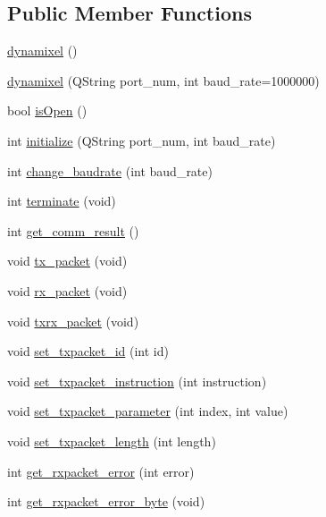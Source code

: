 \subsection*{Public Member Functions}
\begin{DoxyCompactItemize}
\item 
\hyperlink{classdynamixel_a7aa668a213db6a41bede8e08a6fec830}{dynamixel} ()
\item 
\hyperlink{classdynamixel_a5d4fed957a4b2d1690c0fa72127f5cbf}{dynamixel} (Q\+String port\+\_\+num, int baud\+\_\+rate=1000000)
\item 
bool \hyperlink{classdynamixel_a5ae4b2c6eb4c91f404f973ee8e6a1914}{is\+Open} ()
\item 
int \hyperlink{classdynamixel_a87960244d5846ae7583e37d2407eb61e}{initialize} (Q\+String port\+\_\+num, int baud\+\_\+rate)
\item 
int \hyperlink{classdynamixel_a7554c7889896e29e11a62027d89f3fdf}{change\+\_\+baudrate} (int baud\+\_\+rate)
\item 
int \hyperlink{classdynamixel_a92ea074ed1c1a9cf29e039f8c425f01a}{terminate} (void)
\item 
int \hyperlink{classdynamixel_ac8440d5d34ae3c4618b28fdbbd748edc}{get\+\_\+comm\+\_\+result} ()
\item 
void \hyperlink{classdynamixel_a479187cd8940c16dd4374eb5be22b888}{tx\+\_\+packet} (void)
\item 
void \hyperlink{classdynamixel_aa26d2d2dff768563a1cb1480aa061608}{rx\+\_\+packet} (void)
\item 
void \hyperlink{classdynamixel_aebfc569c6b1eb0b98f8c385f0f921fc0}{txrx\+\_\+packet} (void)
\item 
void \hyperlink{classdynamixel_a84e24c72c3e5be866f8b28c2e5bd1d95}{set\+\_\+txpacket\+\_\+id} (int id)
\item 
void \hyperlink{classdynamixel_a209a43f983f214323b6f0a627d5e8c13}{set\+\_\+txpacket\+\_\+instruction} (int instruction)
\item 
void \hyperlink{classdynamixel_a2c3d31bbbed70a69918e9972a620384b}{set\+\_\+txpacket\+\_\+parameter} (int index, int value)
\item 
void \hyperlink{classdynamixel_a829278f48e21c810b172eb8cab3b86de}{set\+\_\+txpacket\+\_\+length} (int length)
\item 
int \hyperlink{classdynamixel_a1bbabb82d7a2764cc4b0b351dd0019e5}{get\+\_\+rxpacket\+\_\+error} (int error)
\item 
int \hyperlink{classdynamixel_a6e62341ef9f51b6e152e769bd7be9d75}{get\+\_\+rxpacket\+\_\+error\+\_\+byte} (void)

\end{DoxyCompactItemize}
